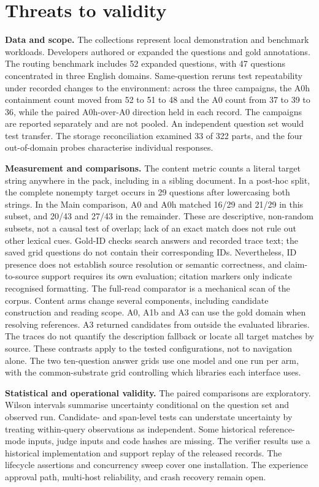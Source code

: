 \section{Threats to validity}
\label{sec:threats}

\noindent\textbf{Data and scope.} The collections represent local
demonstration and benchmark workloads. Developers authored or expanded the
questions and gold annotations. The routing benchmark includes 52 expanded
questions, with 47 questions concentrated in three English domains.
Same-question reruns test repeatability under recorded changes to the
environment: across the three campaigns, the A0h containment count moved
from 52 to 51 to 48 and the A0 count from 37 to 39 to 36, while the
paired A0h-over-A0 direction held in each record. The campaigns are
reported separately and are not pooled. An independent question set would
test transfer. The storage
reconciliation examined 33 of 322 parts, and the four out-of-domain probes
characterise individual responses.

\noindent\textbf{Measurement and comparisons.} The content metric counts a
literal target string anywhere in the pack, including in a sibling
document. In a post-hoc split, the complete nonempty target occurs in 29
questions after lowercasing both strings. In the Main comparison, A0 and
A0h matched 16/29 and 21/29 in this subset, and 20/43 and 27/43 in the
remainder. These are descriptive, non-random subsets, not a causal test of
overlap; lack of an exact match does not rule out other lexical cues.
Gold-ID checks search answers and recorded trace text; the saved grid
questions do not contain their corresponding IDs. Nevertheless, ID presence
does not establish source resolution or semantic correctness, and
claim-to-source support requires its own evaluation; citation markers only
indicate recognised formatting. The full-read comparator is a mechanical
scan of the corpus. Content arms change several components, including candidate
construction and reading scope. A0, A1b and A3 can use the gold domain when
resolving references. A3 returned candidates from outside the evaluated
libraries. The traces do not quantify the description fallback or locate
all target matches by source. These contrasts apply to the tested
configurations, not to navigation alone. The two ten-question answer grids use one
model and one run per arm, with the common-substrate grid controlling which
libraries each interface uses.

\noindent\textbf{Statistical and operational validity.} The paired
comparisons are exploratory. Wilson intervals summarise uncertainty
conditional on the question set and observed run. Candidate- and span-level
tests can understate uncertainty by treating within-query observations as
independent. Some historical reference-mode inputs, judge inputs and code
hashes are missing. The verifier results use a historical implementation
and support replay of the released records. The lifecycle assertions and
concurrency sweep cover one installation. The experience approval path,
multi-host reliability, and crash recovery remain open.
